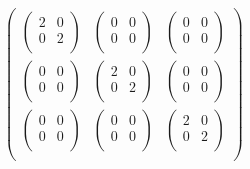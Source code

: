 \documentclass[11pt]{article}
\begin{document}
\begin{enumerate}
    \begin{doublespace}
      \noindent\(\left(
      \begin{array}{ccc}
        \left(
        \begin{array}{cc}
          2 & 0 \\
          0 & 2 \\
        \end{array}
        \right) & \left(
        \begin{array}{cc}
          0 & 0 \\
          0 & 0 \\
        \end{array}
        \right) & \left(
        \begin{array}{cc}
          0 & 0 \\
          0 & 0 \\
        \end{array}
        \right) \\
        \left(
        \begin{array}{cc}
          0 & 0 \\
          0 & 0 \\
        \end{array}
        \right) & \left(
        \begin{array}{cc}
          2 & 0 \\
          0 & 2 \\
        \end{array}
        \right) & \left(
        \begin{array}{cc}
          0 & 0 \\
          0 & 0 \\
        \end{array}
        \right) \\
        \left(
        \begin{array}{cc}
          0 & 0 \\
          0 & 0 \\
        \end{array}
        \right) & \left(
        \begin{array}{cc}
          0 & 0 \\
          0 & 0 \\
        \end{array}
        \right) & \left(
        \begin{array}{cc}
          2 & 0 \\
          0 & 2 \\
        \end{array}
        \right) \\
      \end{array}
      \right)\)
    \end{doublespace}


\end{enumerate}
\end{document}
